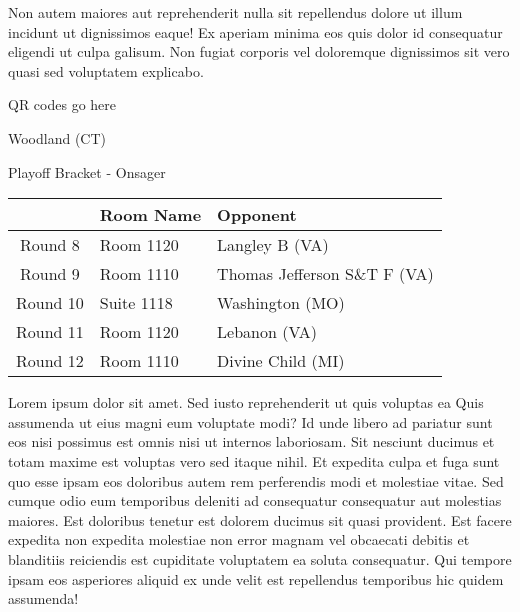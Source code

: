 \documentclass{article}%
\begin{document}
\newline%
Non autem maiores aut reprehenderit nulla sit repellendus dolore ut illum incidunt ut dignissimos eaque! Ex aperiam minima eos quis dolor id consequatur eligendi ut culpa galisum. Non fugiat corporis vel doloremque dignissimos sit vero quasi sed voluptatem explicabo.\newline%
\newline%
%
\vspace*{30pt}%
\begin{center}%
\begin{Huge}%
QR codes go here%
\end{Huge}%
\end{center}%
\newpage%
\begin{center}%
\begin{Huge}%
Woodland (CT)%
\end{Huge}%
\vspace*{8pt}%
\linebreak%
\begin{Large}%
Playoff Bracket {-} Onsager%
\end{Large}%
\end{center}%
\begin{tabularx}{\textwidth}{|c|Y|Y|}%
\hline%
&Room Name&Opponent\\%
\hline%
Round 8&Room 1120&Langley B (VA)\\%
Round 9&Room 1110&Thomas Jefferson S\&T F (VA)\\%
Round 10&Suite 1118&Washington (MO)\\%
Round 11&Room 1120&Lebanon (VA)\\%
Round 12&Room 1110&Divine Child (MI)\\%
\hline%
\end{tabularx}%
\vspace*{8pt}%
\linebreak%
\newline%
\newline%
Lorem ipsum dolor sit amet. Sed iusto reprehenderit ut quis voluptas ea Quis assumenda ut eius magni eum voluptate modi? Id unde libero ad pariatur sunt eos nisi possimus est omnis nisi ut internos laboriosam. Sit nesciunt ducimus et totam maxime est voluptas vero sed itaque nihil. Et expedita culpa et fuga sunt quo esse ipsam eos doloribus autem rem perferendis modi et molestiae vitae.\newline%
\newline%
Sed cumque odio eum temporibus deleniti ad consequatur consequatur aut molestias maiores. Est doloribus tenetur est dolorem ducimus sit quasi provident. Est facere expedita non expedita molestiae non error magnam vel obcaecati debitis et blanditiis reiciendis est cupiditate voluptatem ea soluta consequatur. Qui tempore ipsam eos asperiores aliquid ex unde velit est repellendus temporibus hic quidem assumenda!\newline%
\end{document}
